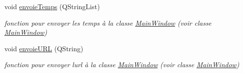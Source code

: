 \begin{DoxyCompactItemize}
void \hyperlink{classRecette_ad90a82b00fc7f1cc7d66ce54a3c853d8}{envoie\+Temps} (Q\+String\+List)
\begin{DoxyCompactList}\small\item\em fonction pour envoyer les temps à la classe \hyperlink{classMainWindow}{Main\+Window} (voir classe \hyperlink{classMainWindow}{Main\+Window}) \end{DoxyCompactList}\item 
void \hyperlink{classRecette_a151a21f960ad1c36b8760dee77352d99}{envoie\+U\+RL} (Q\+String)
\begin{DoxyCompactList}\small\item\em fonction pour envoyer l\textquotesingle{}url à la classe \hyperlink{classMainWindow}{Main\+Window} (voir classe \hyperlink{classMainWindow}{Main\+Window}) \end{DoxyCompactList}\end{DoxyCompactItemize}
